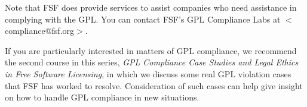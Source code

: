 Note that FSF does provide services to assist companies who need
assistance in complying with the GPL. You can contact FSF's GPL
Compliance Labs at $<$compliance@fsf.org$>$.

If you are particularly interested in matters of GPL compliance, we
recommend the second course in this series, {\em GPL Compliance Case
  Studies and Legal Ethics in Free Software Licensing\/}, in which we
discuss some real GPL violation cases that FSF has worked to resolve.
Consideration of such cases can help give insight on how to handle GPL
compliance in new situations.


